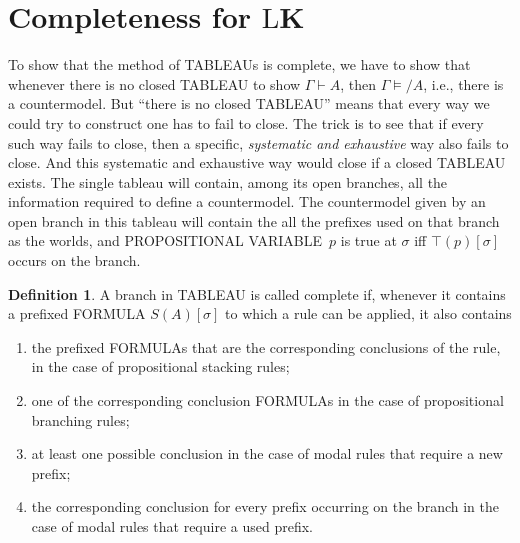 \documentclass[10pt,a4paper]{article}
\newcommand*{\olup}[1]{\MakeUppercase{#1}}
\theoremstyle{plain}
\theoremstyle{definition}
\newtheorem{defn}[thm]{Definition}
\theoremstyle{remark}
\newenvironment{explain}{}{}
\newcommand*{\olfileid}[3]{}
\newcommand*{\olsection}[1]{\section*{#1}}
\providecommand{\Proves}{\mathrel{\vdash}}
\providecommand{\Entails}{\mathrel{\models}}
\providecommand{\sFmla}[2]{#1(#2)}
\providecommand{\True}{\top}
\providecommand{\Log}{\ensuremath{\mathrm{L}}}
\begin{document}



\olfileid{nml}{tab}{cpl}

\olsection{Completeness for \Log{K}}

\begin{explain}
  To show that the method of \olup{tableau}s is complete, we have to show
  that whenever there is no closed \olup{tableau} to show $\Gamma \Proves
  A$, then $\Gamma \Entails/ A$, i.e., there is a countermodel. But
  ``there is no closed \olup{tableau}'' means that every way we could try
  to construct one has to fail to close. The trick is to see that if
  every such way fails to close, then a specific, \emph{systematic and
    exhaustive} way also fails to close. And this systematic and
  exhaustive way would close if a closed \olup{tableau} exists. The
  single tableau will contain, among its open branches, all the
  information required to define a countermodel. The countermodel
  given by an open branch in this tableau will contain the all the
  prefixes used on that branch as the worlds, and \olup{propositional
    variable}~$p$ is true at $\sigma$ iff $\sFmla{\True}{p}[\sigma]$
  occurs on the branch.
\end{explain}

\begin{defn}
  A branch in \olup{tableau} is called complete if, whenever it contains
  a prefixed \olup{formula} $\sFmla{S}{A}[\sigma]$ to which a rule can
  be applied, it also contains
  \begin{enumerate}
    \item the prefixed \olup{formula}s that are the corresponding
      conclusions of the rule, in the case of propositional stacking
      rules;
    \item one of the corresponding conclusion \olup{formula}s in the case
      of propositional branching rules;
    \item at least one possible conclusion in the case of modal rules
      that require a new prefix;
    \item the corresponding conclusion for every prefix occurring on
      the branch in the case of modal rules that require a used
      prefix.
  \end{enumerate}
\end{defn}
\end{document}
